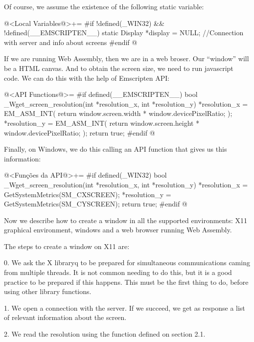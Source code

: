 Of course, we assume the existence of the following static variable:

\iniciocodigo
@<Local Variables@>+=
#if !defined(_WIN32) && !defined(__EMSCRIPTEN__)
static Display *display = NULL; //Connection with server and info about screens
#endif
@
\fimcodigo


If we are running Web Assembly, then we are in a web broser. Our
``window'' will be a HTML canvas. And to obtain the screen size, we
need to run javascript code. We can do this with the help of
Emscripten API:

\iniciocodigo
@<API Functions@>=
#if defined(__EMSCRIPTEN__)
bool _Wget_screen_resolution(int *resolution_x, int *resolution_y){
  *resolution_x = EM_ASM_INT({
    return window.screen.width * window.devicePixelRatio;
  });
  *resolution_y = EM_ASM_INT({
    return window.screen.height * window.devicePixelRatio;
  });
  return true;
}
#endif
@
\fimcodigo



Finally, on Windows, we do this calling an API function that gives us
this information:

\iniciocodigo
@<Funções da API@>+=
#if defined(_WIN32)
bool _Wget_screen_resolution(int *resolution_x, int *resolution_y){
  *resolution_x = GetSystemMetrics(SM_CXSCREEN);
  *resolution_y = GetSystemMetrics(SM_CYSCREEN);
  return true;
}
#endif
@
\fimcodigo


Now we describe how to create a window in all the supported
environments: X11 graphical environment, windows and a web browser
running Web Assembly.


The steps to create a window on X11 are:

0. We ask the X libraryq to be prepared for simultaneous
communications caming from multiple threads. It is not common needing
to do this, but it is a good practice to be prepared if this
happens. This must be the first thing to do, before using other
library functions.

1. We open a connection with the server. If we succeed, we get as
response a list of relevant information about the screen.

2. We read the resolution using the function defined on section 2.1.

